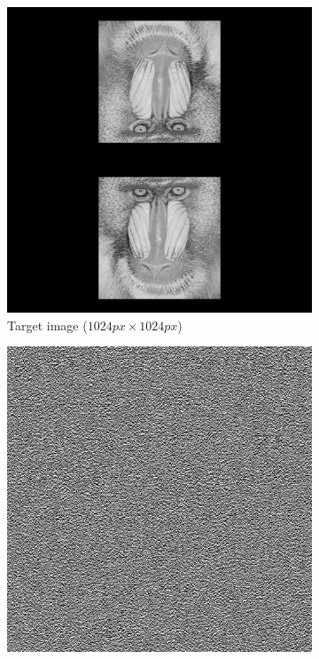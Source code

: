 \begin{figure}[H]
  \centering
  \begin{subfigure}[t]{0.3\textwidth}
    \centering
    \includegraphics[width=\textwidth]{mandrill_2.png}
    \caption{Target image ($1024 px\times 1024 px$)}
    \label{fig:mandrill_2_GS}
  \end{subfigure}
  \hfill
  \begin{subfigure}[t]{0.3\textwidth}
    \centering
    \includegraphics[width=\textwidth]{GS_Holo_mandrill_2.png}

\end{subfigure}
\end{figure}
